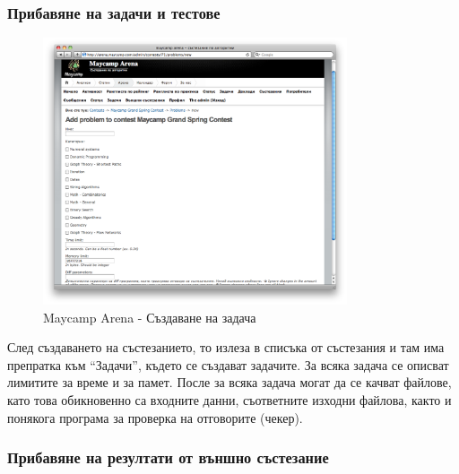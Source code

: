 \documentclass[a4paper,12pt]{article}
\begin{document}
  \pagebreak
  
  \subsubsection{Прибавяне на задачи и тестове}

  \begin{figure}[ht]
    \begin{center}
      \includegraphics[width=0.8\textwidth]{images/maycamp_arena_admin_problem.png}
    \end{center}
    \caption{Maycamp Arena - Създаване на задача}
    \label{arena_admin_problem}
  \end{figure}
  
  След създаването на състезанието, то излеза в списъка от състезания и там има препратка към ``Задачи'', където се създават задачите. За всяка задача се описват лимитите за време и за памет. После за всяка задача могат да се качват файлове, като това обикновенно са входните данни, съответните изходни файлова, както и понякога програма за проверка на отговорите (чекер).
  
  \pagebreak
  
  \subsubsection{Прибавяне на резултати от външно състезание}
\end{document}
